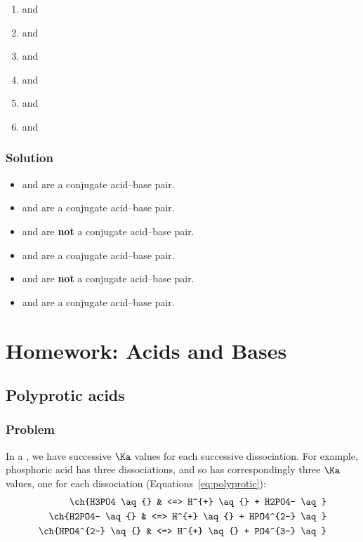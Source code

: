 \begin{enumerate}
	\item {} and 
	\item {} and 
	\item {} and 
	\item {} and 
	\item {} and 
	\item {} and 
\end{enumerate}
\subsubsection{Solution}
\begin{itemize}
	\item {\color{accent}  and } are a conjugate acid--base pair.
	\item {\color{accent}  and } are a conjugate acid--base pair.
	\item {} and  are \textbf{not} a conjugate acid--base pair.
	\item {\color{accent}  and } are a conjugate acid--base pair.
	\item {} and  are \textbf{not} a conjugate acid--base pair.
	\item {\color{accent}  and } are a conjugate acid--base pair.
\end{itemize}

\pagebreak
\section{Homework: Acids and Bases}
\subsection{Polyprotic acids}
\subsubsection{Problem}
In a  ,
we have successive \(\Ka\) values for each successive
dissociation. For example, phosphoric acid has three dissociations, and so has
correspondingly three \(\Ka\) values, one for each dissociation (Equations~\ref{eq:polyprotic}):
\begin{align*}
	\ch{H3PO4 \aq{}     & <=> H^{+} \aq{} + H2PO4- \aq}    \nonumber                      \\
	\ch{H2PO4- \aq{}    & <=> H^{+} \aq{} + HPO4^{2-} \aq} \nonumber                      \\
	\ch{HPO4^{2-} \aq{} & <=> H^{+} \aq{} + PO4^{3-} \aq} \nonumber \label{eq:polyprotic}
\end{align*}

